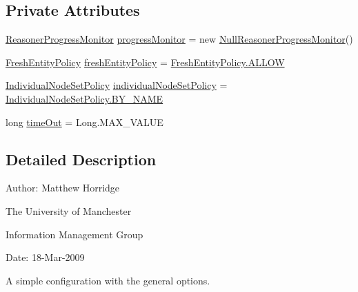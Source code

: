 \subsection*{Private Attributes}
\begin{DoxyCompactItemize}
\item 
\hyperlink{interfaceorg_1_1semanticweb_1_1owlapi_1_1reasoner_1_1_reasoner_progress_monitor}{Reasoner\-Progress\-Monitor} \hyperlink{classorg_1_1semanticweb_1_1owlapi_1_1reasoner_1_1_simple_configuration_a6eb0739db219366ebced5caf69f0e76b}{progress\-Monitor} = new \hyperlink{classorg_1_1semanticweb_1_1owlapi_1_1reasoner_1_1_null_reasoner_progress_monitor}{Null\-Reasoner\-Progress\-Monitor}()
\item 
\hyperlink{enumorg_1_1semanticweb_1_1owlapi_1_1reasoner_1_1_fresh_entity_policy}{Fresh\-Entity\-Policy} \hyperlink{classorg_1_1semanticweb_1_1owlapi_1_1reasoner_1_1_simple_configuration_ae0a8075a44a762793ba7b2bef1e77088}{fresh\-Entity\-Policy} = \hyperlink{enumorg_1_1semanticweb_1_1owlapi_1_1reasoner_1_1_fresh_entity_policy_a8f3d06d4ac09dbdb0e9d8da43e06cfc5}{Fresh\-Entity\-Policy.\-A\-L\-L\-O\-W}
\item 
\hyperlink{enumorg_1_1semanticweb_1_1owlapi_1_1reasoner_1_1_individual_node_set_policy}{Individual\-Node\-Set\-Policy} \hyperlink{classorg_1_1semanticweb_1_1owlapi_1_1reasoner_1_1_simple_configuration_aca31b0f98015ca016d152edda401b8aa}{individual\-Node\-Set\-Policy} = \hyperlink{enumorg_1_1semanticweb_1_1owlapi_1_1reasoner_1_1_individual_node_set_policy_a1fbf26b542eea4dd37010729986bce6c}{Individual\-Node\-Set\-Policy.\-B\-Y\-\_\-\-N\-A\-M\-E}
\item 
long \hyperlink{classorg_1_1semanticweb_1_1owlapi_1_1reasoner_1_1_simple_configuration_ad006d256f73e69db1a3220aeab8c363c}{time\-Out} = Long.\-M\-A\-X\-\_\-\-V\-A\-L\-U\-E
\end{DoxyCompactItemize}


\subsection{Detailed Description}
Author\-: Matthew Horridge\par
 The University of Manchester\par
 Information Management Group\par
 Date\-: 18-\/\-Mar-\/2009

A simple configuration with the general options. 

